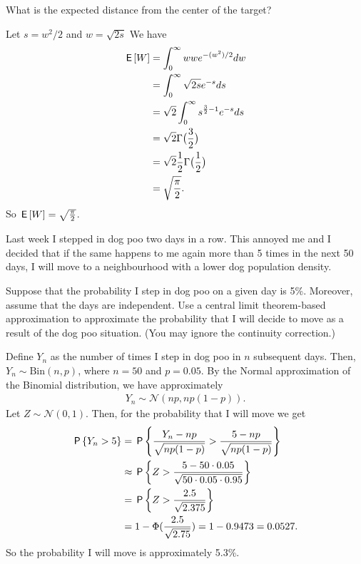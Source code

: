 \begin{exercise}
What is the expected distance from the center of the target?
\begin{solution}

Let $s = w^2/2$ and $w = \sqrt{2s}$
We have
\begin{align}
    \E{W} &= \int_{0}^{\infty} w w e^{-(w^2)/2} dw \\
    &= \int_{0}^{\infty} \sqrt{2s} e^{-s} ds \\
    &= \sqrt{2}\int_{0}^{\infty} s^{\frac{3}{2}-1} e^{-s} ds \\
    &= \sqrt{2}\Gamma\big(\frac{3}{2}\big) \\
    &= \sqrt{2} \frac{1}{2}\Gamma\big(\frac{1}{2}\big) \\
    &= \sqrt{\frac{\pi}{2}}.
\end{align}
So $\E{W} = \sqrt{\frac{\pi}{2}}$.
\end{solution}
\end{exercise}

Last week I stepped in dog poo two days in a row. This annoyed me and I decided that if the same happens to me again more than 5 times in the next 50 days, I will move to a neighbourhood with a lower dog population density.

\begin{exercise}
Suppose that the probability I step in dog poo on a given day is 5\%. Moreover, assume that the days are independent. Use a central limit theorem-based approximation to approximate the probability that I will decide to move as a result of the dog poo situation. (You may ignore the continuity correction.)
\begin{solution}
Define $Y_n$ as the number of times I step in dog poo in $n$ subsequent days. Then, $Y_n \sim \text{Bin}(n, p)$, where $n=50$ and $p = 0.05$. By the Normal approximation of the Binomial distribution, we have approximately
\begin{align}
    Y_n \sim \mathcal{N}(np, np(1-p)).
\end{align}
Let $Z \sim \mathcal{N}(0,1)$. Then, for the probability that I will move we get
\begin{align}
    \P{Y_n > 5} &= \P{\frac{Y_n - np}{\sqrt{np(1-p)}} > \frac{5 - np}{\sqrt{np(1-p)}} } \\
    &\approx \P{Z > \frac{5 - 50\cdot 0.05}{\sqrt{50 \cdot 0.05 \cdot 0.95}} } \\
    &= \P{Z > \frac{2.5}{\sqrt{2.375}} } \\
    &= 1 - \Phi(\frac{2.5}{\sqrt{2.75}}) =  1 - 0.9473 = 0.0527.
\end{align}
So the probability I will move is approximately 5.3\%.
\end{solution}
\end{exercise}


